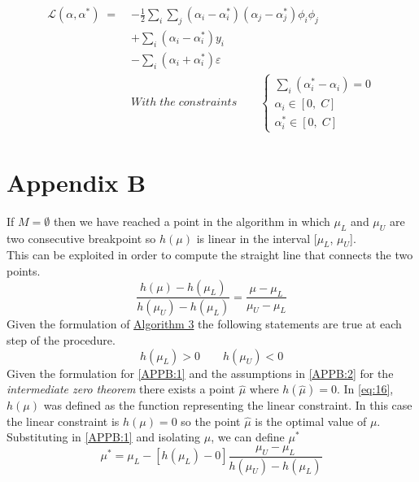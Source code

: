 \documentclass[12pt]{article}
\newcommand{\Lagr}{\mathcal{L}}
\begin{document}
    \begin{equation*}
        \begin{aligned}
            \Lagr(\alpha, \alpha^*)\;=\;&-\frac{1}{2}\sum_i\sum_j (\alpha_i - \alpha_i^*)(\alpha_j - \alpha_j^*)\phi_i\phi_j \\
            &+ \sum_i (\alpha_i - \alpha_i^*)y_i \\
            &- \sum_i (\alpha_i + \alpha_i^*)\varepsilon \\
            &With\;the\;constraints\qquad
            \begin{cases}
                \sum_i (\alpha_i^* - \alpha_i) = 0 \\
                \alpha_i\in[0,\;C] \\
                \alpha_i^*\in[0,\;C]
            \end{cases}
        \end{aligned}
    \end{equation*}
    \pagebreak
    \section{Appendix B}\label{appendixB}
    If $M = \emptyset$ then we have reached a point in the algorithm in which $\mu_L$ and $\mu_U$ are two consecutive breakpoint so $h(\mu)$ is linear in the interval [$\mu_L$, $\mu_U$].\\
    This can be exploited in order to compute the straight line that connects the two points.
    \begin{equation}\label{APPB:1}
        \frac{h(\mu) - h(\mu_L)}{h(\mu_U) - h(\mu_L)} = \frac{\mu - \mu_L}{\mu_U - \mu_L} 
    \end{equation}
    Given the formulation of \hyperref[algo:3]{Algorithm 3} the following statements are true at each step of the procedure.
    \begin{equation}\label{APPB:2}
        h(\mu_L) > 0 \qquad h(\mu_U) < 0
    \end{equation}
    Given the formulation for \eqref{APPB:1} and the assumptions in \eqref{APPB:2} for the \textit{intermediate zero theorem} there exists a point $\hat{\mu}$ where $h(\hat{\mu}) = 0$. In \eqref{eq:16}, $h(\mu)$ was defined as the function representing the linear constraint. In this case the linear constraint is $h(\mu) = 0$ so the point $\hat{\mu}$ is the optimal value of $\mu$.\\
    Substituting in \eqref{APPB:1} and isolating $\mu$, we can define $\mu^*$
    \begin{equation}
        \mu^* = \mu_L - [h(\mu_L) - 0]\frac{\mu_U - \mu_L}{h(\mu_U) - h(\mu_L)}
    \end{equation}
\end{document}
